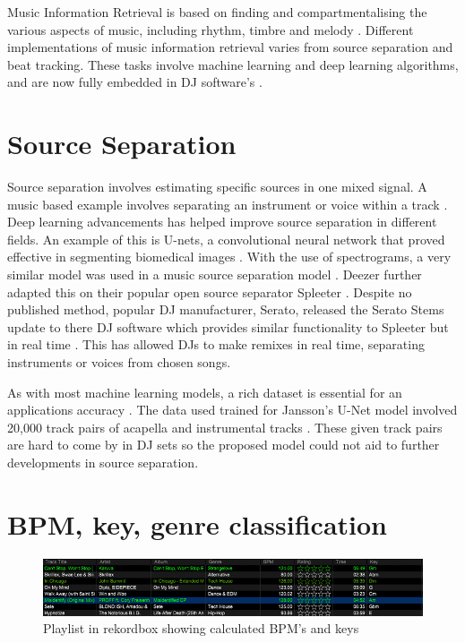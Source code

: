 Music Information Retrieval is based on finding and compartmentalising the various aspects of music, including rhythm, timbre and melody \citep{orio_music_2006}. Different implementations of music information retrieval varies from source separation and beat tracking. These tasks involve machine learning and deep learning algorithms, and are now fully embedded in DJ software's \citep{rekordbox_rekordbox_2020}. 

\section{Source Separation}

Source separation involves estimating specific sources in one mixed signal. A music based example involves separating an instrument or voice within a track \citep{sgouros_efficient_2022}. Deep learning advancements has helped improve source separation in different fields. An example of this is U-nets, a convolutional neural network that proved effective in segmenting biomedical images \citep{ronneberger_u-net_2015}. With the use of spectrograms, a very similar model was used in a music source separation model \citep{jansson_singing_2017}. Deezer  further adapted this on their popular open source separator Spleeter \citep{hennequin_spleeter_2020}. Despite no published method, popular DJ manufacturer, Serato, released the Serato Stems update to there DJ software which provides similar functionality to Spleeter but in real time \citep{kirn_review_2023}. This has allowed DJs to make remixes in real time, separating instruments or voices from chosen songs.

As with most machine learning models, a rich dataset is essential for an applications accuracy \citep{jain_overview_2020}. The data used trained for Jansson's U-Net model involved 20,000 track pairs of acapella and instrumental tracks \citep{jansson_singing_2017}. These given track pairs are hard to come by in DJ sets so the proposed model could not aid to further developments in source separation.


\section{BPM, key, genre classification}

\begin{figure}[H]
	\hspace*{-1.9cm}
	\includegraphics[scale=0.7]{images/rekordbox}
	\centering
	\caption{Playlist in rekordbox showing calculated BPM's and keys \citep{rekordbox_rekordbox_2023}} 
\end{figure}


